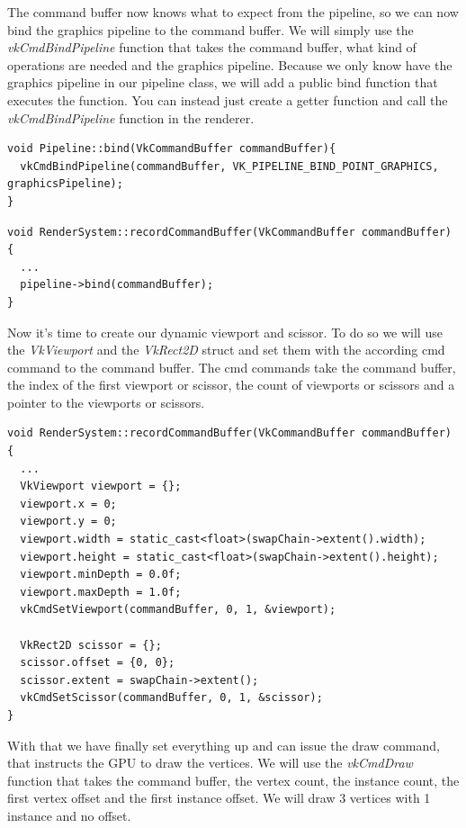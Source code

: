 \documentclass[12pt]{report} \usepackage{preamble}
\begin{document}
The command buffer now knows what to expect from the pipeline, so we can now bind the graphics pipeline to the command buffer.
We will simply use the \textit{vkCmdBindPipeline} function that takes the command buffer, what kind of
operations are needed and the graphics pipeline. Because we only know have the graphics pipeline in our pipeline class, we
will add a public bind function that executes the function. You can instead just create a getter function and call the
\textit{vkCmdBindPipeline} function in the renderer.

\begin{lstlisting}[Language=C++]
void Pipeline::bind(VkCommandBuffer commandBuffer){
  vkCmdBindPipeline(commandBuffer, VK_PIPELINE_BIND_POINT_GRAPHICS, graphicsPipeline);
}
\end{lstlisting}

\begin{lstlisting}[Language=C++]
void RenderSystem::recordCommandBuffer(VkCommandBuffer commandBuffer) {
  ...
  pipeline->bind(commandBuffer);
}
\end{lstlisting}

Now it's time to create our dynamic viewport and scissor. To do so we will use the \textit{VkViewport} and the \textit{VkRect2D}
struct and set them with the according cmd command to the command buffer. The cmd commands take the command buffer, the index
of the first viewport or scissor, the count of viewports or scissors and a pointer to the viewports or scissors.

\begin{lstlisting}[Language=C++]
void RenderSystem::recordCommandBuffer(VkCommandBuffer commandBuffer) {
  ...
  VkViewport viewport = {};
  viewport.x = 0;
  viewport.y = 0;
  viewport.width = static_cast<float>(swapChain->extent().width);
  viewport.height = static_cast<float>(swapChain->extent().height);
  viewport.minDepth = 0.0f;
  viewport.maxDepth = 1.0f;
  vkCmdSetViewport(commandBuffer, 0, 1, &viewport);

  VkRect2D scissor = {};
  scissor.offset = {0, 0};
  scissor.extent = swapChain->extent();
  vkCmdSetScissor(commandBuffer, 0, 1, &scissor);
}
\end{lstlisting}

With that we have finally set everything up and can issue the draw command, that instructs the GPU to draw the vertices.
We will use the \textit{vkCmdDraw} function that takes the command buffer, the vertex count, the instance count, the first vertex offset
and the first instance offset. We will draw 3 vertices with 1 instance and no offset.
\end{document}
